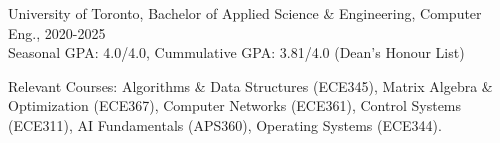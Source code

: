 University of Toronto, Bachelor of Applied Science \& Engineering, Computer Eng., 2020-2025 \\
Seasonal GPA: 4.0/4.0, Cummulative GPA: 3.81/4.0 (Dean’s Honour List) \\[3.75pt]
\raggedright{Relevant Courses: Algorithms \& Data Structures (ECE345), Matrix Algebra \& Optimization (ECE367), 
Computer Networks (ECE361), Control Systems (ECE311), AI Fundamentals (APS360), Operating Systems (ECE344).}

